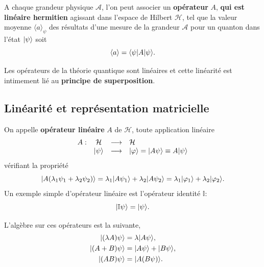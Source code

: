 \colorbox[gray]{0.8}{
\parbox[c]{0.9\textwidth}{
\begin{principe}
A chaque grandeur physique $\mathcal{A}$, l'on peut associer un
\textbf{opérateur} $A$, \textbf{qui est linéaire hermitien} agissant dans
l'espace de Hilbert $\mathcal{H}$, tel que la valeur moyenne $\langle a\rangle
_{\psi}$ des résultats d'une mesure de la grandeur $\mathcal{A}$ pour un
quanton dans l'état $\vert\psi\rangle$ soit%
\begin{equation}
\langle a\rangle =\langle\psi\vert A\vert\psi\rangle.
\end{equation}
\end{principe}
}}\medskip

Les opérateurs de la théorie quantique sont linéaires et cette linéarité est
intimement lié au \textbf{principe de superposition}.

\subsection{Linéarité et représentation matricielle}

On appelle \textbf{opérateur linéaire }$A$ de $\mathcal{H}$, toute
application linéaire
\begin{equation}%
\begin{array}
[c]{ccll}%
A: & \mathcal{H} & \longrightarrow & \mathcal{H}\\
& \ket{\psi}  & \longrightarrow & \ket{\varphi} =\ket{A\psi} \equiv A\ket{\psi}
\end{array}
\end{equation}
vérifiant la propriété
\begin{equation}
\vert A(\lambda_1\psi_1+\lambda_{2}\psi_{2})\rangle
=\lambda_1\vert A\psi_1\rangle +\lambda_{2}\vert A\psi_{2}\rangle
=\lambda_1\vert\varphi_1\rangle +\lambda_{2}\vert\varphi_{2}\rangle.
\end{equation}
Un exemple simple d'opérateur linéaire est l'opérateur identité $\mathbb{I}$:%
\begin{equation}
\vert\mathbb{I}\psi\rangle =\vert\psi\rangle.
\end{equation}

L'algèbre sur ces opérateurs est la suivante,
\begin{subequations}%
\begin{align}
\vert(\lambda A)\psi\rangle &  =\lambda\vert A\psi\rangle,\\
\vert(A+B)\psi\rangle &  =\vert A\psi\rangle +\vert B\psi\rangle,\\
\vert(AB)\psi\rangle &  =\vert A(B\psi)\rangle.
\end{align}%
\end{subequations}%

